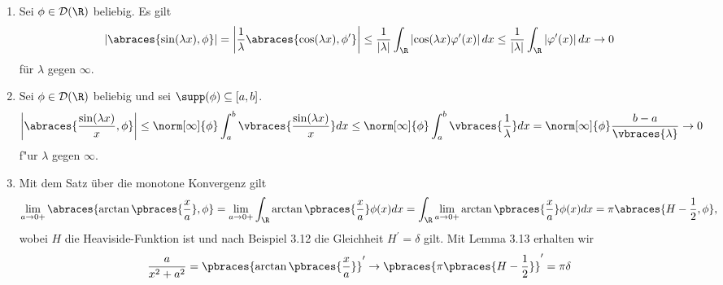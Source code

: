 \begin{solution}
\phantom{}
\begin{enumerate}[label = (\roman*)]
	\item Sei $\phi \in \mathcal{D}(\R)$ beliebig. Es gilt
	\begin{align*}
	\left|\abraces{\sin(\lambda x), \phi}\right| = \left|\frac{1}{\lambda}\abraces{\cos(\lambda x), \phi^\prime}\right| \leq \frac{1}{|\lambda|} \int_\R \left|\cos(\lambda x) \varphi^\prime(x)\right| dx \leq \frac{1}{|\lambda|} \int_\R \left|\varphi^\prime(x)\right| dx \rightarrow 0
	\end{align*}
	für $\lambda$ gegen $\infty$.
	\item Sei $\phi \in \mathcal{D}(\R)$ beliebig und sei $\supp(\phi)\subseteq [a, b]$.
	\begin{align*}
	\left|\abraces{\frac{\sin(\lambda x)}{x}, \phi}\right| \leq \norm[\infty]{\phi}\int_a^b \vbraces{\frac{\sin(\lambda x)}{x}} dx \leq \norm[\infty]{\phi}\int_a^b \vbraces{\frac{1}{\lambda}} dx = \norm[\infty]{\phi} \frac{b - a}{\vbraces{\lambda}} \to 0
	\end{align*}
	f"ur $\lambda$ gegen $\infty$.
	\item Mit dem Satz über die monotone Konvergenz gilt
	\begin{align*}
	\lim_{a \to 0+}\abraces{\arctan\pbraces{\frac{x}{a}}, \phi} = \lim_{a \to 0+} \int_\R \arctan\pbraces{\frac{x}{a}} \phi(x) dx = \int_\R \lim_{a \to 0+} \arctan\pbraces{\frac{x}{a}} \phi(x) dx = \pi \abraces{H - \frac{1}{2}, \phi},
	\end{align*}
	wobei $H$ die Heaviside-Funktion ist und nach Beispiel 3.12 die Gleichheit $H^\prime = \delta$ gilt. Mit Lemma 3.13 erhalten wir
	\begin{align*}
	\frac{a}{x^2 + a^2} = \pbraces{\arctan\pbraces{\frac{x}{a}}}^\prime \to \pbraces{\pi\pbraces{H - \frac{1}{2}}}^\prime = \pi \delta
	\end{align*}
\end{enumerate}

\end{solution}

